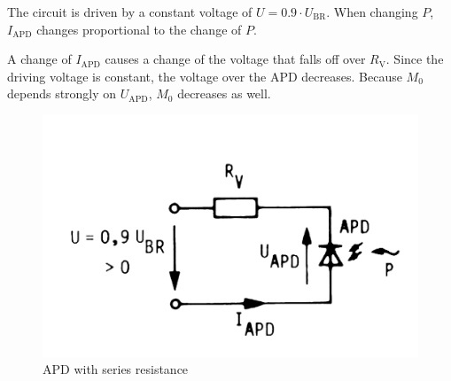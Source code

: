 The circuit is driven by a constant voltage of $U = 0.9\cdot U_{\mathrm{BR}}$. When changing $P$, $I_{\mathrm{APD}}$ changes proportional to the change of $P$.

A change of $I_{\mathrm{APD}}$ causes a change of the voltage that falls off over $R_{\mathrm{V}}$. Since the driving voltage is constant, the voltage over the APD decreases. Because $M_0$ depends strongly on $U_{\mathrm{APD}}$, $M_0$ decreases as well. 



\begin{figure}%
\centering
\includegraphics[width=.5\columnwidth]{Grafiken/Q4_APD.jpg}%
\caption{APD with series resistance}%
\label{fig:Q4_APD}%
\end{figure}


